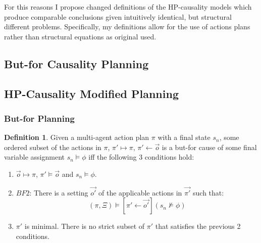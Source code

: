 \documentclass{article}
\theoremstyle{plain}
\theoremstyle{definition}
\newtheorem{defn}[thm]{Definition} %
\begin{document}
For this reasons I propose changed definitions of the HP-causality models which produce comparable conclusions given intuitively identical, but structural different problems. Specifically, my definitions allow for the use of actions plans rather than structural equations as original used.

\subsection{But-for Causality Planning}

\subsection{HP-Causality Modified Planning}

\subsubsection*{But-for Planning}
\begin{defn} 

Given a multi-agent action plan $\pi$ with a final state $s_n$, some ordered subset of the actions in $\pi$, $\pi' \mapsto \pi$, $\pi' \leftarrow \vec{o}$ is a but-for cause of some final variable assignment $s_n \models \phi$ iff the following 3 conditions hold:
\begin{enumerate}
\item  $\vec{o} \mapsto \pi$, $\pi' \models \vec{o}$ and $s_n \models \phi$.
\item $BF2$: There is a setting $\vec{o'}$ of the applicable actions in $\vec{\pi'}$ such that:
\[
(\pi, \Xi) \models [\pi' \leftarrow \vec{o'}](s_n \not\models \phi)
\]
\item $\pi'$ is minimal. There is no strict subset of $\pi'$ that satisfies the previous 2 conditions.
\end{enumerate}


\end{defn}
\end{document}
